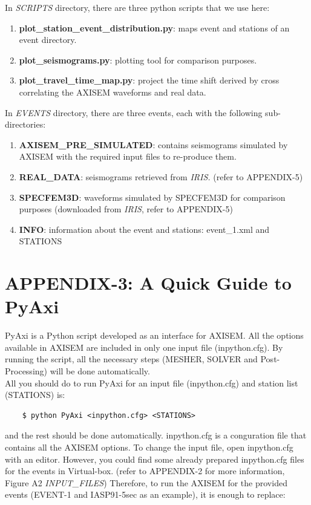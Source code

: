 \documentclass{article}
\begin{document}
In \textit{SCRIPTS} directory, there are three python scripts that we use here:

\begin{enumerate}
    \item \textbf{plot\_station\_event\_distribution.py}: maps event and stations of an
    event directory.
    \item \textbf{plot\_seismograms.py}: plotting tool for comparison purposes.
    \item \textbf{plot\_travel\_time\_map.py}: project the time shift derived by cross
    correlating the AXISEM waveforms and real data.
\end{enumerate}

In \textit{EVENTS} directory, there are three events, each with the following
sub-directories:

\begin{enumerate}
    \item \textbf{AXISEM\_PRE\_SIMULATED}: contains seismograms simulated by AXISEM with
    the required input files to re-produce them.
    \item \textbf{REAL\_DATA}: seismograms retrieved from \textit{IRIS. }(refer to
    APPENDIX-5)
    \item \textbf{SPECFEM3D}: waveforms simulated by SPECFEM3D for comparison purposes 
    (downloaded from\textit{ IRIS}, refer to APPENDIX-5)
    \item \textbf{INFO}: information about the event and stations: event\_1.xml and
    STATIONS
\end{enumerate}


\newpage
\section{APPENDIX-3: A Quick Guide to PyAxi}

PyAxi is a Python script developed as an interface for AXISEM. All the options 
available in AXISEM are included in only one input file (inpython.cfg). By running 
the script, all the necessary steps (MESHER, SOLVER and Post-Processing) will be 
done automatically. \\

All you should do to run PyAxi for an input file (inpython.cfg) and station list 
(STATIONS) is:
\begin{verbatim}
    $ python PyAxi <inpython.cfg> <STATIONS>
\end{verbatim}

and the rest should be done automatically. inpython.cfg is a conguration file that 
contains all the AXISEM options. To change the input file, open inpython.cfg with 
an editor. However, you could find some already prepared inpython.cfg files for 
the events in Virtual-box. (refer to APPENDIX-2 for more information, Figure A2 
\textit{INPUT\_FILES}) Therefore, to run the AXISEM for the provided events (EVENT-1 
and IASP91-5sec as an example), it is enough to replace:
\end{document}
